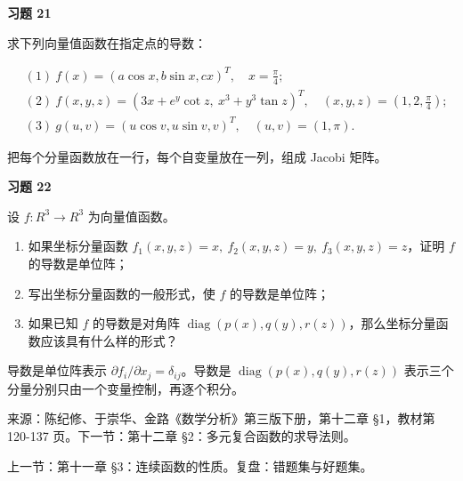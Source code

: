 \begin{exercisebox}
\textbf{习题 21}

求下列向量值函数在指定点的导数：

\[
      \begin{aligned}
      &(1)\ f(x)=(a\cos x,b\sin x,cx)^T,\quad x=\frac{\pi}{4};\\
      &(2)\ f(x,y,z)=(3x+e^y\cot z,\ x^3+y^3\tan z)^T,\quad
      (x,y,z)=\left(1,2,\frac{\pi}{4}\right);\\
      &(3)\ g(u,v)=(u\cos v,u\sin v,v)^T,\quad (u,v)=(1,\pi).
      \end{aligned}
      \]

\begin{hintbox}
把每个分量函数放在一行，每个自变量放在一列，组成 Jacobi 矩阵。
\end{hintbox}
\end{exercisebox}

\begin{exercisebox}
\textbf{习题 22}

设 \(f:R^3\to R^3\) 为向量值函数。

\begin{enumerate}
 \item 如果坐标分量函数 \(f_1(x,y,z)=x,\ f_2(x,y,z)=y,\ f_3(x,y,z)=z\)，证明 \(f\) 的导数是单位阵；
 \item 写出坐标分量函数的一般形式，使 \(f\) 的导数是单位阵；
 \item 如果已知 \(f\) 的导数是对角阵 \(\operatorname{diag}(p(x),q(y),r(z))\)，那么坐标分量函数应该具有什么样的形式？
 \end{enumerate}

\begin{hintbox}
导数是单位阵表示 \(\partial f_i/\partial x_j=\delta_{ij}\)。导数是 \(\operatorname{diag}(p(x),q(y),r(z))\) 表示三个分量分别只由一个变量控制，再逐个积分。
\end{hintbox}
\end{exercisebox}

来源：陈纪修、于崇华、金路《数学分析》第三版下册，第十二章 §1，教材第 120-137 页。下一节：第十二章 §2：多元复合函数的求导法则。

上一节：第十一章 §3：连续函数的性质。复盘：错题集与好题集。
